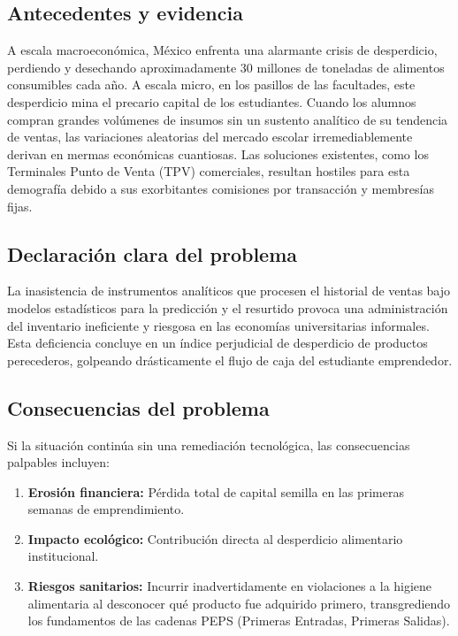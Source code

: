 \documentclass[12pt, a4paper]{article}
\begin{document}
\subsection{Antecedentes y evidencia}
A escala macroeconómica, México enfrenta una alarmante crisis de desperdicio, perdiendo y desechando aproximadamente 30 millones de toneladas de alimentos consumibles cada año. A escala micro, en los pasillos de las facultades, este desperdicio mina el precario capital de los estudiantes. Cuando los alumnos compran grandes volúmenes de insumos sin un sustento analítico de su tendencia de ventas, las variaciones aleatorias del mercado escolar irremediablemente derivan en mermas económicas cuantiosas. Las soluciones existentes, como los Terminales Punto de Venta (TPV) comerciales, resultan hostiles para esta demografía debido a sus exorbitantes comisiones por transacción y membresías fijas.

\subsection{Declaración clara del problema}
La inasistencia de instrumentos analíticos que procesen el historial de ventas bajo modelos estadísticos para la predicción y el resurtido provoca una administración del inventario ineficiente y riesgosa en las economías universitarias informales. Esta deficiencia concluye en un índice perjudicial de desperdicio de productos perecederos, golpeando drásticamente el flujo de caja del estudiante emprendedor.

\subsection{Consecuencias del problema}
Si la situación continúa sin una remediación tecnológica, las consecuencias palpables incluyen:
\begin{enumerate}
    \item \textbf{Erosión financiera:} Pérdida total de capital semilla en las primeras semanas de emprendimiento.
    \item \textbf{Impacto ecológico:} Contribución directa al desperdicio alimentario institucional.
    \item \textbf{Riesgos sanitarios:} Incurrir inadvertidamente en violaciones a la higiene alimentaria al desconocer qué producto fue adquirido primero, transgrediendo los fundamentos de las cadenas PEPS (Primeras Entradas, Primeras Salidas).
\end{enumerate}
\end{document}
